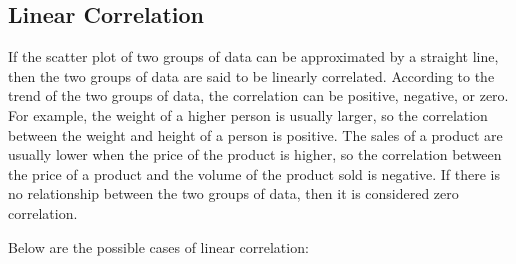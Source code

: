 \documentclass{report}
\begin{document}
\begin{multicols}{2}
  \subsection*{Linear Correlation}

  If the scatter plot of two groups of data can be approximated by a straight
  line, then the two groups of data are said to be linearly correlated. According
  to the trend of the two groups of data, the correlation can be positive,
  negative, or zero. For example, the weight of a higher person is usually
  larger, so the correlation between the weight and height of a person is
  positive. The sales of a product are usually lower when the price of the
  product is higher, so the correlation between the price of a product and the
  volume of the product sold is negative. If there is no relationship between the
  two groups of data, then it is considered zero correlation.

  Below are the possible cases of linear correlation:


\end{multicols}
\end{document}
